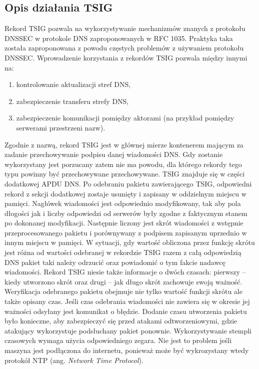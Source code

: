 \subsection{Opis działania TSIG}
Rekord TSIG pozwala na wykorzystywanie mechanizmów znanych z protokołu DNSSEC\cite{nask-tsig} w protokole DNS zaproponowanych w RFC 1035\cite{RFC1035}. Praktyka taka została zaproponowana z powodu częstych problemów z używaniem protokołu DNSSEC\cite{RFC4033, RFC4035}. Wprowadzenie korzystania z rekordów TSIG pozwala między innymi na:
\begin{enumerate}
	\item kontrolowanie aktualizacji stref DNS,
	\item zabezpieczenie transferu strefy DNS,
	\item zabezpieczenie komunikacji pomiędzy aktorami (na przykład pomiędzy serwerami przestrzeni nazw).
\end{enumerate}

Zgodnie z nazwą, rekord TSIG jest w głównej mierze kontenerem mającym za zadanie przechowywanie podpisu danej wiadomości DNS. Gdy zostanie wykorzystany jest porzucany zatem nie ma powodu, dla którego rekordy tego typu powinny być przechowywane przechowywane. TSIG znajduje się w części dodatkowej APDU DNS. Po odebraniu pakietu zawierającego TSIG, odpowiedni rekord z sekcji dodatkowej zostaje usunięty i zapisany w oddzielnym miejscu w pamięci. Nagłówek wiadomości jest odpowiednio modyfikowany, tak aby pola dłogości jak i liczby odpowiedzi od serwerów były zgodne z faktycznym stanem po dokonanej modyfikacji. Następnie liczony jest skrót wiadomości z wstępnie przeprocesowanego pakietu i porównywany z podpisem zapisanym uprzednio w innym miejscu w pamięci. W sytuacji, gdy wartość obliczona przez funkcję skrótu jest różna od wartości odebranej w rekordzie TSIG razem z całą odpowiedzią DNS pakiet taki należy odrzucić oraz powiadomić o tym fakcie nadawcę wiadomości. Rekord TSIG niesie także informacje o dwóch czasach: pierwszy -- kiedy utworzono skrót oraz drugi -- jak długo skrót zachowuje swoją ważność. Weryfikacja odebranego pakietu obejmuje nie tylko wartość funkcji skrótu ale także opisany czas. Jeśli czas odebrania wiadomości nie zawiera się w okresie jej ważności odsyłany jest komunikat o błędzie. Dodanie czasu utworzenia pakietu było konieczne, aby zabezpieczyć się przed atakami odtworzeniowymi, gdzie atakujący wykorzystuje podsłuchany pakiet ponownie. Wykorzystywanie stempli czasowych wymaga użycia odpowiedniego zegara. Nie jest to problem jeśli maszyna jest podłączona do internetu, ponieważ może być wykrozystany wtedy protokół NTP (ang. \textit{Network Time Protocol})\cite{RFC5905}.

